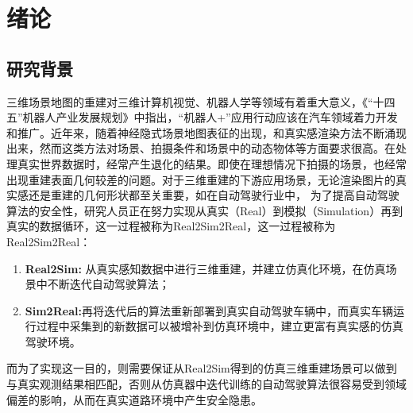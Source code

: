 %
%
%
%
%
%

\chapter{绪论}

\section{研究背景}
三维场景地图的重建对三维计算机视觉、机器人学等领域有着重大意义，《“十四五”机器人产业发展规划》中指出，“机器人+”应用行动应该在汽车领域着力开发和推广。近年来，随着神经隐式场景地图表征的出现，和真实感渲染方法不断涌现出来，然而这类方法对场景、拍摄条件和场景中的动态物体等方面要求很高。在处理真实世界数据时，经常产生退化的结果。即使在理想情况下拍摄的场景，也经常出现重建表面几何较差的问题。对于三维重建的下游应用场景，无论渲染图片的真实感还是重建的几何形状都至关重要，如在自动驾驶行业中， 为了提高自动驾驶算法的安全性，研究人员正在努力实现从真实（Real）到模拟（Simulation）再到真实的数据循环，这一过程被称为Real2Sim2Real，这一过程被称为Real2Sim2Real：
\begin{enumerate}
    \item \textbf{Real2Sim:} 从真实感知数据中进行三维重建，并建立仿真化环境，在仿真场景中不断迭代自动驾驶算法；
    \item \textbf{Sim2Real:}再将迭代后的算法重新部署到真实自动驾驶车辆中，而真实车辆运行过程中采集到的新数据可以被增补到仿真环境中，建立更富有真实感的仿真驾驶环境。
\end{enumerate}

而为了实现这一目的，则需要保证从Real2Sim得到的仿真三维重建场景可以做到与真实观测结果相匹配，否则从仿真器中迭代训练的自动驾驶算法很容易受到领域偏差的影响，从而在真实道路环境中产生安全隐患。

